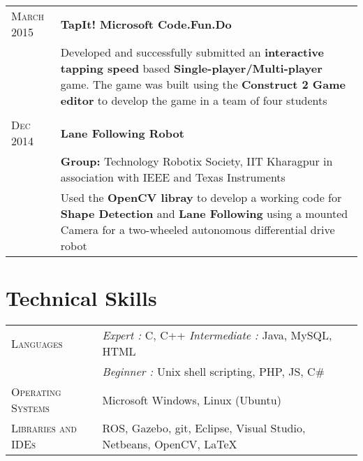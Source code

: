 \documentclass[a4paper,10pt]{extarticle} %
\begin{document}
\begin{tabular}{R{3.0cm}|p{15.0cm}}
\textsc{March 2015} & \textbf{TapIt! Microsoft Code.Fun.Do}\\
& \footnotesize{Developed and successfully submitted an \textbf{interactive tapping speed} based \textbf{Single-player/Multi-player} game. The game was built using the \textbf{Construct 2 Game editor} to develop the game in a team of four students}\\
 \\

\textsc{Dec 2014} & \textbf{Lane Following Robot} \\
& \textbf{Group: }\textmd{Technology Robotix Society}, IIT Kharagpur in association with IEEE and Texas Instruments\\
& \textmd{Used the \textbf{OpenCV libray} to develop a working code for \textbf{Shape Detection} and \textbf{Lane Following} using a mounted Camera for a two-wheeled autonomous differential drive robot}\\

\end{tabular}


\section{Technical Skills}

\begin{tabular}{R{3.0cm}|p{15.0cm}}
\textsc{Languages} & {\itshape{Expert : }}C, C++ {\itshape{Intermediate : }}Java, MySQL, HTML\\
& {\itshape{Beginner : }}Unix shell scripting, PHP, JS, C\# \\
\textsc{Operating Systems} &  Microsoft Windows, Linux (Ubuntu)\\
\textsc{Libraries and IDEs} & ROS, Gazebo, git, Eclipse, Visual Studio, Netbeans, OpenCV, LaTeX\\
\end{tabular}
\end{document}
